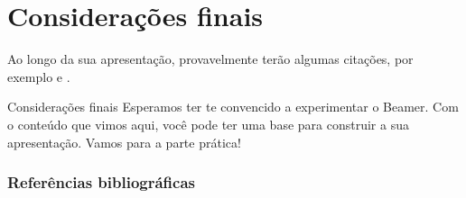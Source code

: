 \documentclass{beamer} %
\begin{document}
\section{Considerações finais}
\begin{frame}
    Ao longo da sua apresentação, provavelmente terão algumas citações, por exemplo \cite{einstein}  e \cite{knuth}.
\end{frame} 


\begin{frame}{Considerações finais}
Esperamos ter te convencido a experimentar o Beamer.
Com o conteúdo que vimos aqui, você pode ter uma base para construir a sua apresentação.
Vamos para a parte prática!
    
\end{frame}


\begin{frame}
\frametitle{Referências bibliográficas}
\printbibliography
\end{frame}
\end{document}
